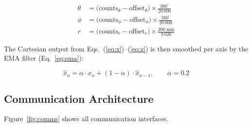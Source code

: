 \documentclass[11pt,a4paper]{article}
\begin{document}
\begin{align}
  \theta &= \bigl(\text{counts}_\theta - \text{offset}_\theta\bigr)
             \times \tfrac{360^\circ}{20\,000} \label{eq:theta}\\[3pt]
  \phi   &= \bigl(\text{counts}_\phi - \text{offset}_\phi\bigr)
             \times \tfrac{360^\circ}{20\,000} \label{eq:phi}\\[3pt]
  r      &= \bigl(\text{counts}_r - \text{offset}_r\bigr)
             \times \tfrac{200\;\text{mm}}{8\,020} \label{eq:r}
\end{align}

The Cartesian output from Eqs.~(\ref{eq:x})--(\ref{eq:z}) is then
smoothed per axis by the EMA filter (Eq.~\ref{eq:ema}):

\begin{equation}
  \hat{x}_n = \alpha \cdot x_n + (1 - \alpha) \cdot \hat{x}_{n-1},
  \qquad \alpha = 0.2
  \label{eq:ema}
\end{equation}

\subsection{Communication Architecture}

Figure~\ref{fig:comms} shows all communication interfaces.
\end{document}
